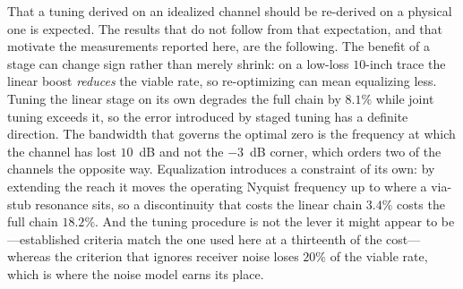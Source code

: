 \documentclass[twocolumn]{USG}
\begin{document}
That a tuning derived on an idealized channel should be re-derived on a
physical one is expected. The results that do not follow from that expectation,
and that motivate the measurements reported here, are the following. The
benefit of a stage can change sign rather than merely shrink: on a low-loss
$10$-inch trace the linear boost \emph{reduces} the viable rate, so
re-optimizing can mean equalizing less. Tuning the linear stage on its own
degrades the full chain by $8.1\%$ while joint tuning exceeds it, so the error
introduced by staged tuning has a definite direction. The bandwidth that
governs the optimal zero is the frequency at which the channel has lost
$10$~dB and not the $-3$~dB corner, which orders two of the channels the
opposite way. Equalization introduces a constraint of its own: by extending the
reach it moves the operating Nyquist frequency up to where a via-stub resonance
sits, so a discontinuity that costs the linear chain $3.4\%$ costs the full
chain $18.2\%$. And the tuning procedure is not the lever it might appear to
be---established criteria match the one used here at a thirteenth of the
cost---whereas the criterion that ignores receiver noise loses $20\%$ of the
viable rate, which is where the noise model earns its place.
\end{document}
